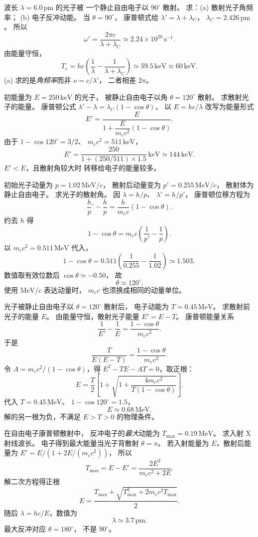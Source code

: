 波长 $\lambda=6.0\,\mathrm{pm}$ 的光子被
一个静止自由电子以 $90^\circ$ 散射。
求：(a) 散射光子角频率；
(b) 电子反冲动能。
\exsolution
当 $\theta=90^\circ$，
康普顿式给 $\lambda'=\lambda+\lambda_C$，
$\lambda_C=2.426\,\mathrm{pm}$。
所以
\[
 \boxed{\omega'=\frac{2\pi c}{\lambda+\lambda_C}
 \simeq2.24\times10^{20}\,\mathrm{s^{-1}}}.
\]
由能量守恒，
\[
 \boxed{T_e=hc\left(\frac1\lambda-
 \frac1{\lambda+\lambda_C}\right)
 \simeq59.5\,\mathrm{keV}\approx60\,\mathrm{keV}}.
\]
\excheck (a) 求的是\emph{角频率}而非 $\nu=c/\lambda'$，
二者相差 $2\pi$。

初能量为 $E=250\,\mathrm{keV}$ 的光子，
被静止自由电子以角 $\theta=120^\circ$ 散射。
求散射光子的能量。
\exsolution
康普顿公式
$\lambda'-\lambda=\lambda_C(1-\cos\theta)$，
以 $E=hc/\lambda$ 改写为能量形式
\[
 E'=\frac E{1+
 \dfrac E{m_ec^2}(1-\cos\theta)}.
\]
由于
$1-\cos120^\circ=3/2$、
$m_ec^2=511\,\mathrm{keV}$，
\[
 \boxed{E'=
 \frac{250}{1+(250/511)\times1.5}\,\mathrm{keV}
 \simeq144\,\mathrm{keV}}.
\]
\excheck $E'<E$，且散射角较大时
转移给电子的能量较多。

初始光子动量为
$p=1.02\,\mathrm{MeV}/c$，
散射后动量变为
$p'=0.255\,\mathrm{MeV}/c$，
散射体为静止自由电子。
求光子的散射角。
\exsolution
因 $\lambda=h/p$、
$\lambda'=h/p'$，
康普顿位移方程为
\[
 \frac hp'-\frac hp=
 \frac h{m_ec}(1-\cos\theta).
\]
约去 $h$ 得
\[
 \boxed{1-\cos\theta=
 m_ec\left(\frac1{p'}-\frac1p\right)}.
\]
以 $m_ec^2=0.511\,\mathrm{MeV}$ 代入，
\[
 1-\cos\theta=
 0.511\left(\frac1{0.255}-\frac1{1.02}\right)
 \simeq1.503,
\]
数值取有效位数后 $\cos\theta\simeq-0.50$，
故
\[
 \boxed{\theta\simeq120^\circ}.
\]
\excheck 使用 $\mathrm{MeV}/c$ 表达动量时，
$m_ec$ 也须换成相同的动量单位。

光子被静止自由电子以
$\theta=120^\circ$ 散射后，
电子动能为 $T=0.45\,\mathrm{MeV}$。
求散射前光子的能量 $E$。
\exsolution
由能量守恒，散射光子能量 $E'=E-T$。
康普顿能量关系
\[
 \frac1{E'}-\frac1E=
 \frac{1-\cos\theta}{m_ec^2}.
\]
于是
\[
 \frac{T}{E(E-T)}
 =\frac{1-\cos\theta}{m_ec^2}.
\]
令 $A=m_ec^2/(1-\cos\theta)$，得
$E^2-TE-AT=0$，取正根：
\[
 \boxed{E=\frac T2
 \left[1+\sqrt{1+
 \frac{4m_ec^2}{T(1-\cos\theta)}}\right]}.
\]
代入 $T=0.45\,\mathrm{MeV}$、
$1-\cos120^\circ=1.5$，
\[
 \boxed{E\simeq0.68\,\mathrm{MeV}}.
\]
\excheck 解的另一根为负，不满足
$E>T>0$ 的物理条件。

在自由电子康普顿散射中，
反冲电子的\emph{最大}动能为
$T_{\max}=0.19\,\mathrm{MeV}$。
求入射 X 射线波长。
\exsolution
电子得到最大能量当光子背散射 $\theta=\pi$。
若入射能量为 $E$，散射后能量为
$E'=E/(1+2E/(m_ec^2))$，
所以
\[
 T_{\max}=E-E'=
 \frac{2E^2}{m_ec^2+2E}.
\]
解二次方程得正根
\[
 \boxed{E=
 \frac{T_{\max}+
 \sqrt{T_{\max}^2+2m_ec^2T_{\max}}}{2}}.
\]
随后 $\lambda=hc/E$，数值为
\[
 \boxed{\lambda\simeq3.7\,\mathrm{pm}}.
\]
\excheck 最大反冲对应 $\theta=180^\circ$，
不是 $90^\circ$。

